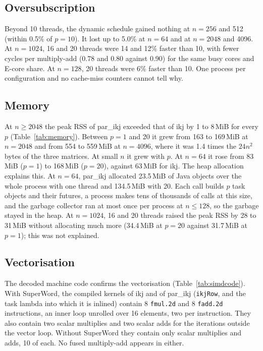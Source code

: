 \documentclass[11pt,a4paper]{article}
\newcommand{\tabledir}{../analysis/tables}
\begin{document}
\subsection{Oversubscription}

Beyond 10 threads, the dynamic schedule gained nothing at $n=256$ and 512
(within 0.5\% of $p=10$). It lost up to 5.0\% at $n=64$ and at $n=2048$ and
4096. At $n=1024$, 16 and 20 threads were 14 and 12\% faster than 10, with fewer
cycles per multiply-add (0.78 and 0.80 against 0.90) for the same busy cores and
E-core share. At $n=128$, 20 threads were 6\% faster than 10. One process per
configuration and no cache-miss counters cannot tell why.

\subsection{Memory}

At $n\ge2048$ the peak RSS of par\_ikj exceeded that of ikj by 1 to 8\,MiB
for every $p$ (Table~\ref{tab:memory}). Between $p=1$ and 20 it grew from 163
to 169\,MiB at $n=2048$ and from 554 to 559\,MiB at $n=4096$, where it was 1.4
times the $24n^2$ bytes of the three matrices. At small $n$ it grew with $p$.
At $n=64$ it rose from 83\,MiB ($p=1$) to 168\,MiB ($p=20$), against 63\,MiB
for ikj. The heap allocation explains this. At $n=64$, par\_ikj allocated
23.5\,MiB of Java objects over the whole process with one thread and 134.5\,MiB
with 20. Each call builds $p$ task objects and their futures, a process makes
tens of thousands of calls at this size, and the garbage collector ran at most
once per process at $n\le128$, so the garbage stayed in the heap. At $n=1024$,
16 and 20 threads raised the peak RSS by 28 to 31\,MiB without allocating
much more (34.4\,MiB at $p=20$ against 31.7\,MiB at $p=1$); this was not
explained.

\begin{table}[tbp]
\centering
\caption{Peak RSS (MiB) of ikj and par\_ikj (dynamic), Java heap allocated over
the whole process by par\_ikj (MiB), and element storage $24n^2$ (MiB).}
\label{tab:memory}
\small

\end{table}

\subsection{Vectorisation}

The decoded machine code confirms the vectorisation (Table~\ref{tab:simdcode}).
With SuperWord, the compiled kernels of ikj and of par\_ikj (\texttt{ikjRow},
and the task lambda into which it is inlined) contain 8 \texttt{fmul.2d} and 8
\texttt{fadd.2d} instructions, an inner loop unrolled over 16 elements, two per
instruction. They also contain two scalar multiplies and two scalar adds for the
iterations outside the vector loop. Without SuperWord they contain only scalar
multiplies and adds, 10 of each. No fused multiply-add appears in either.
\end{document}
